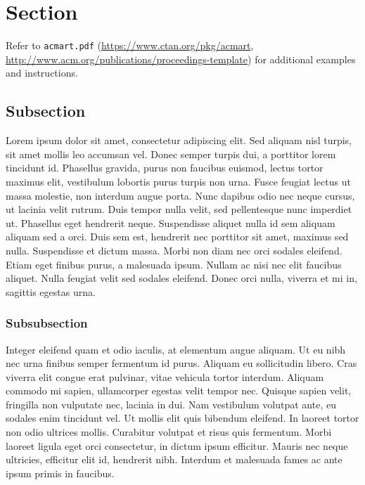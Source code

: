 \documentclass[10pt,sigconf]{acmart}
\begin{document}




\maketitle

\section{Section}

Refer to \verb|acmart.pdf| \cite{veytsmanlatex} (\url{https://www.ctan.org/pkg/acmart}, \url{http://www.acm.org/publications/proceedings-template}) for additional examples and instructions.

\subsection{Subsection}

Lorem ipsum dolor sit amet, consectetur adipiscing elit. Sed aliquam nisl turpis, sit amet mollis leo accumsan vel. Donec semper turpis dui, a porttitor lorem tincidunt id. Phasellus gravida, purus non faucibus euismod, lectus tortor maximus elit, vestibulum lobortis purus turpis non urna. Fusce feugiat lectus ut massa molestie, non interdum augue porta. Nunc dapibus odio nec neque cursus, ut lacinia velit rutrum. Duis tempor nulla velit, sed pellentesque nunc imperdiet ut. Phasellus eget hendrerit neque. Suspendisse aliquet nulla id sem aliquam aliquam sed a orci. Duis sem est, hendrerit nec porttitor sit amet, maximus sed nulla. Suspendisse et dictum massa. Morbi non diam nec orci sodales eleifend. Etiam eget finibus purus, a malesuada ipsum. Nullam ac nisi nec elit faucibus aliquet. Nulla feugiat velit sed sodales eleifend. Donec orci nulla, viverra et mi in, sagittis egestas urna.

\subsubsection{Subsubsection}

Integer eleifend quam et odio iaculis, at elementum augue aliquam. Ut eu nibh nec urna finibus semper fermentum id purus. Aliquam eu sollicitudin libero. Cras viverra elit congue erat pulvinar, vitae vehicula tortor interdum. Aliquam commodo mi sapien, ullamcorper egestas velit tempor nec. Quisque sapien velit, fringilla non vulputate nec, lacinia in dui. Nam vestibulum volutpat ante, eu sodales enim tincidunt vel. Ut mollis elit quis bibendum eleifend. In laoreet tortor non odio ultrices mollis. Curabitur volutpat et risus quis fermentum. Morbi laoreet ligula eget orci consectetur, in dictum ipsum efficitur. Mauris nec neque ultricies, efficitur elit id, hendrerit nibh. Interdum et malesuada fames ac ante ipsum primis in faucibus.
\end{document}

